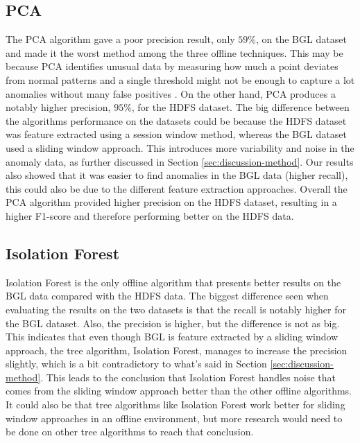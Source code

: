\subsection{PCA}
The PCA algorithm gave a poor precision result, only $59$\%, on the BGL dataset and made it the worst method among the three offline techniques. This may be because PCA identifies unusual data by measuring how much a point deviates from normal patterns and a single threshold might not be enough to capture a lot anomalies without many false positives \cite{Shilin2017experiencereport}. On the other hand, PCA produces a notably higher precision, $95$\%, for the HDFS dataset. The big difference between the algorithms performance on the datasets could be because the HDFS dataset was feature extracted using a session window method, whereas the BGL dataset used a sliding window approach. This introduces more variability and noise in the anomaly data, as further discussed in Section \ref{sec:discussion-method}. Our results also showed that it was easier to find anomalies in the BGL data (higher recall), this could also be due to the different feature extraction approaches. Overall the PCA algorithm provided higher precision on the HDFS dataset, resulting in a higher F1-score and therefore performing better on the HDFS data. 

\subsection{Isolation Forest}
Isolation Forest is the only offline algorithm that presents better results on the BGL data compared with the HDFS data.  The biggest difference seen when evaluating the results on the two datasets is that the recall is notably higher for the BGL dataset. Also, the precision is higher, but the difference is not as big. This indicates that even though BGL is feature extracted by a sliding window approach, the tree algorithm, Isolation Forest, manages to increase the precision slightly, which is a bit contradictory to what’s said in Section \ref{sec:discussion-method}. This leads to the conclusion that Isolation Forest handles noise that comes from the sliding window approach better than the other offline algorithms. It could also be that tree algorithms like Isolation Forest work better for sliding window approaches in an offline environment, but more research would need to be done on other tree algorithms to reach that conclusion.


